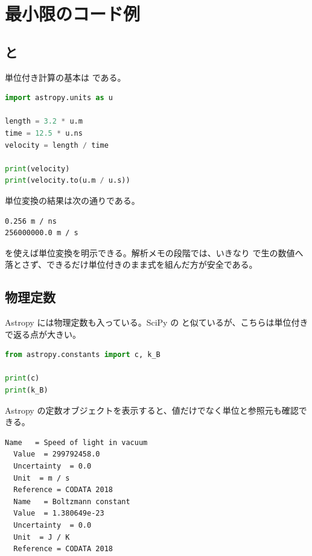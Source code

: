 \section{最小限のコード例}

\subsection{ と }

単位付き計算の基本は  である。

\begin{lstlisting}[language=Python]
import astropy.units as u

length = 3.2 * u.m
time = 12.5 * u.ns
velocity = length / time

print(velocity)
print(velocity.to(u.m / u.s))
\end{lstlisting}

単位変換の結果は次の通りである。

\begin{lstlisting}[numbers=none, xleftmargin=2\zw]
0.256 m / ns
256000000.0 m / s
\end{lstlisting}

 を使えば単位変換を明示できる。解析メモの段階では、いきなり  で生の数値へ落とさず、できるだけ単位付きのまま式を組んだ方が安全である。

\subsection{物理定数}

Astropy には物理定数も入っている。SciPy の  と似ているが、こちらは単位付きで返る点が大きい。

\begin{lstlisting}[language=Python]
from astropy.constants import c, k_B

print(c)
print(k_B)
\end{lstlisting}

Astropy の定数オブジェクトを表示すると、値だけでなく単位と参照元も確認できる。

\begin{lstlisting}[numbers=none, xleftmargin=2\zw]
  Name   = Speed of light in vacuum
  Value  = 299792458.0
  Uncertainty  = 0.0
  Unit  = m / s
  Reference = CODATA 2018
  Name   = Boltzmann constant
  Value  = 1.380649e-23
  Uncertainty  = 0.0
  Unit  = J / K
  Reference = CODATA 2018
\end{lstlisting}

